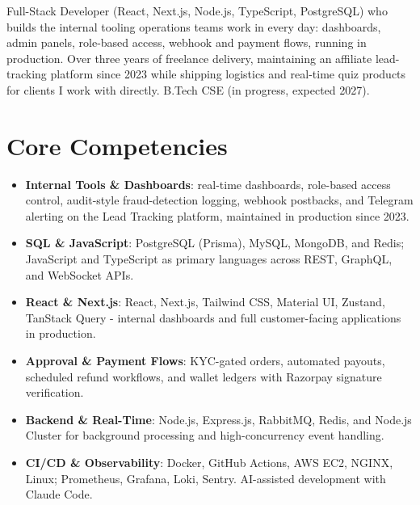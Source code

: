 \documentclass[11pt,a4paper,sans]{moderncv}
\begin{document}
\makecvtitle


\vspace{6pt}
\small{Full-Stack Developer (React, Next.js, Node.js, TypeScript, PostgreSQL) who builds the internal tooling operations teams work in every day: dashboards, admin panels, role-based access, webhook and payment flows, running in production. Over three years of freelance delivery, maintaining an affiliate lead-tracking platform since 2023 while shipping logistics and real-time quiz products for clients I work with directly. B.Tech CSE (in progress, expected 2027).}


\section{Core Competencies}
\vspace{1pt}
\begin{itemize}

\item \textbf{Internal Tools \& Dashboards}: real-time dashboards, role-based access control, audit-style fraud-detection logging, webhook postbacks, and Telegram alerting on the Lead Tracking platform, maintained in production since 2023.

\item \textbf{SQL \& JavaScript}: PostgreSQL (Prisma), MySQL, MongoDB, and Redis; JavaScript and TypeScript as primary languages across REST, GraphQL, and WebSocket APIs.

\item \textbf{React \& Next.js}: React, Next.js, Tailwind CSS, Material UI, Zustand, TanStack Query - internal dashboards and full customer-facing applications in production.

\item \textbf{Approval \& Payment Flows}: KYC-gated orders, automated payouts, scheduled refund workflows, and wallet ledgers with Razorpay signature verification.

\item \textbf{Backend \& Real-Time}: Node.js, Express.js, RabbitMQ, Redis, and Node.js Cluster for background processing and high-concurrency event handling.

\item \textbf{CI/CD \& Observability}: Docker, GitHub Actions, AWS EC2, NGINX, Linux; Prometheus, Grafana, Loki, Sentry. AI-assisted development with Claude Code.

\end{itemize}
\end{document}
